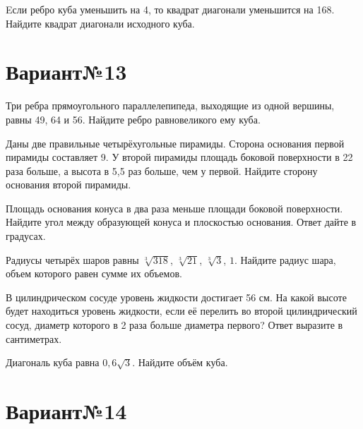 \documentclass[4apaper]{article}
\begin{document}
\begin{taskBN}{6}
Eсли ребро куба уменьшить на 4, то квадрат диагонали уменьшится на 168. Найдите квадрат диагонали исходного куба.
\end{taskBN}
\newpage\section*{Вариант№13}

\begin{taskBN}{1}
Три ребра прямоугольного параллелепипеда, выходящие из одной вершины, равны 49, 64 и 56. Найдите ребро равновеликого ему куба.
\end{taskBN}

\begin{taskBN}{2}
Даны две правильные четырёхугольные пирамиды. Сторона основания первой пирамиды составляет 9. У второй пирамиды площадь боковой поверхности в 22 раза больше, а высота в 5,5 раз больше, чем у первой. Найдите сторону основания второй пирамиды.
\end{taskBN}

\begin{taskBN}{3}
Площадь основания конуса в два раза меньше площади боковой поверхности. Найдите угол между образующей конуса и плоскостью основания. Ответ дайте в градусах.
\end{taskBN}

\begin{taskBN}{4}
Радиусы четырёх шаров равны $\sqrt[3]{318}$, $\sqrt[3]{21}$, $\sqrt[3]{3}$, $1$. Найдите радиус шара, объем которого равен сумме их объемов.
\end{taskBN}

\begin{taskBN}{5}
В цилиндрическом сосуде уровень жидкости достигает 56 см. На какой высоте будет находиться уровень жидкости, если её перелить во второй цилиндрический сосуд, диаметр которого в 2 раза больше диаметра первого? Ответ выразите в сантиметрах.
\end{taskBN}

\begin{taskBN}{6}
Диагональ куба равна $0,6\sqrt{3}$. Найдите объём куба.
\end{taskBN}
\newpage\section*{Вариант№14}
\end{document}
